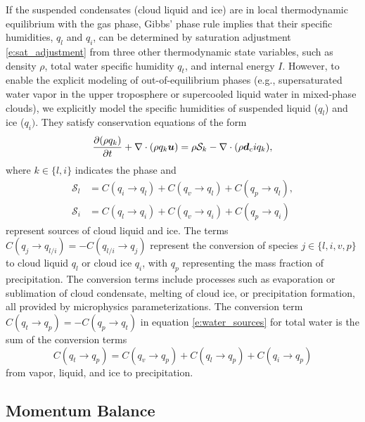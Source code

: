 \documentclass{article}
\begin{document}
If the suspended condensates (cloud liquid and ice) are in local thermodynamic equilibrium with the gas phase, Gibbs' phase rule implies that their specific humidities, $q_l$ and $q_i$, can be determined by saturation adjustment \eqref{e:sat_adjustment} from three other thermodynamic state variables, such as density $\rho$, total water specific humidity $q_t$, and internal energy $I$. However, to enable the explicit modeling of out-of-equilibrium phases (e.g., supersaturated water vapor in the upper troposphere or supercooled liquid water in mixed-phase clouds), we explicitly model the specific humidities of suspended liquid ($q_l$) and ice ($q_i)$. They satisfy conservation equations of the form
\begin{equation}
\frac{\partial (\rho q_k)}{\partial t} + \nabla \cdot (\rho q_k \boldsymbol{{u}}) = \rho \mathcal{S}_k  -\nabla \cdot (\rho \boldsymbol{{d}}_ci
{q
_k}),   
\label{eq:governing_equations/condensate}
\end{equation}
where $k \in \{l, i\}$ indicates the phase and 
\begin{align}
    \mathcal{S}_l & = C(q_i \rightarrow q_l) + C(q_v \rightarrow q_l) + C(q_p \rightarrow q_l), \\
    \mathcal{S}_i & = C(q_l \rightarrow q_i) + C(q_v \rightarrow q_i) + C(q_p \rightarrow q_i)
\end{align}
represent sources of cloud liquid and ice. The terms $C(q_j \rightarrow q_{l/i}) = - C(q_{l/i} \rightarrow q_j)$ represent the conversion of species $j \in \{l, i, v, p\}$ to cloud liquid $q_l$ or cloud ice $q_i$, with $q_p$ representing the mass fraction of precipitation. The conversion terms include processes such as evaporation or sublimation of cloud condensate, melting of cloud ice, or precipitation formation, all provided by microphysics parameterizations. The conversion term $C(q_t \rightarrow q_p) = -C(q_p \rightarrow q_t)$ in equation \eqref{e:water_sources} for total water is the sum of the conversion terms
\begin{equation}
    C(q_t \rightarrow q_p) = C(q_v \rightarrow q_p) + C(q_l \rightarrow q_p) + C(q_i \rightarrow q_p)
\end{equation}
from vapor, liquid, and ice to precipitation. 

\subsection{Momentum Balance}
\end{document}

